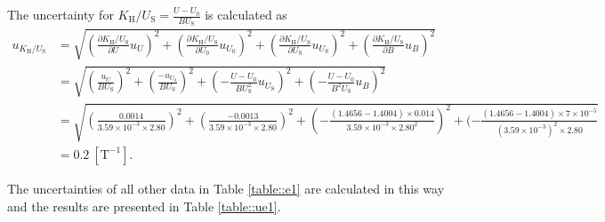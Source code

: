 \documentclass[a4paper]{article}
\begin{document}
The uncertainty for $ K_\text{H}/U_\text{S} = \frac{U-U_0}{BU_\text{S}} $ is calculated as
\begin{align*}
	u_{K_\text{H}/U_\text{S}} & = \sqrt{(\frac{\partial K_\text{H}/U_\text{S}}{\partial U}u_U)^2+(\frac{\partial K_\text{H}/U_\text{S}}{\partial U_0}u_{U_0})^2+(\frac{\partial K_\text{H}/U_\text{S}}{\partial U_\text{S}}u_{U_\text{S}})^2+(\frac{\partial K_\text{H}/U_\text{S}}{\partial B}u_B)^2} \\
	                          & = \sqrt{(\frac{u_U}{BU_\text{S}})^2+(\frac{-u_{U_0}}{BU_\text{S}})^2+(-\frac{U-U_0}{BU_\text{S}^2}u_{U_\text{S}})^2+(-\frac{U-U_0}{B^2U_\text{S}}u_{B})^2}                                                                                                             \\
	                          & = \sqrt{(\frac{0.0014}{3.59\times10^{-3}\times2.80})^2+(\frac{-0.0013}{3.59\times10^{-3} \times2.80})^2+(-\frac{(1.4656-1.4004)\times 0.014}{3.59\times10^{-3} \times 2.80^2})^2+(-\frac{(1.4656-1.4004)\times 7\times 10^{-5}}{{(3.59\times 10^{-3})}^2 \times 2.80}} \\
	                          & =0.2\ [\text{T}^{-1}].
\end{align*}

The uncertainties of all other data in Table \ref{table::e1} are calculated in this way and the results are presented in Table \ref{table::ue1}.
\end{document}
